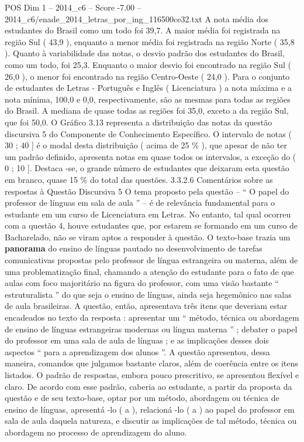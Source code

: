 \begin{textsample}{POS Dim 1 – 2014\_c6 – Score -7.00 – 2014\_c6/enade\_2014\_letras\_por\_ing\_116500ce32.txt}
A nota média dos estudantes do Brasil como um todo foi 39,7.
A maior média foi registrada na região Sul ( 43,9 ), enquanto a menor média foi registrada na região Norte ( 35,8 ).
Quanto à variabilidade das notas, o desvio padrão dos estudantes do Brasil, como um todo, foi 25,3.
Enquanto o maior desvio foi encontrado na região Sul ( 26,0 ), o menor foi encontrado na região Centro-Oeste ( 24,0 ).
Para o conjunto de estudantes de Letras - Português e Inglês ( Licenciatura ) a nota máxima e a nota mínima, 100,0 e 0,0, respectivamente, são as mesmas para todas as regiões do Brasil.
A mediana de quase todas as regiões foi 35,0, exceto a da região Sul, que foi 50,0.
O Gráfico 3.13 representa a distribuição das notas da questão discursiva 5 do Componente de Conhecimento Específico.
O intervalo de notas ( 30 ; 40 ] é o modal desta distribuição ( acima de 25 \% ), que apesar de não ter um padrão definido, apresenta notas em quase todos os intervalos, a exceção do ( 0 ; 10 ].
Destaca -se, o grande número de estudantes que deixaram esta questão em branco, quase 15 \% do total das questões. 3.3.2.6 Comentários sobre as respostas à Questão Discursiva 5 O tema proposto pela questão – “ O papel do professor de línguas em sala de aula ” – é de relevância fundamental para o estudante em um curso de Licenciatura em Letras.
No entanto, tal qual ocorreu com a questão 4, houve estudantes que, por estarem se formando em um curso de Bacharelado, não se viram aptos a responder à questão.
O texto-base trazia um \textbf{panorama} do ensino de línguas pautado no desenvolvimento de tarefas comunicativas propostas pelo professor de língua estrangeira ou materna, além de uma problematização final, chamando a atenção do estudante para o fato de que aulas com foco majoritário na figura do professor, com uma visão bastante “ estruturalista ” do que seja o ensino de línguas, ainda seja hegemônico nas salas de aula brasileiras.
A questão, então, apresentava três itens que deveriam estar encadeados no texto da resposta : apresentar um “ método, técnica ou abordagem de ensino de línguas estrangeiras modernas ou língua materna ” ; debater o papel do professor em uma sala de aula de línguas ; e as implicações desses dois aspectos “ para a aprendizagem dos alunos ”.
A questão apresentou, dessa maneira, comandos que julgamos bastante claros, além de coerência entre os itens listados.
O padrão de respostas, embora pouco prescritivo, se apresentou flexível e claro.
De acordo com esse padrão, caberia ao estudante, a partir da proposta da questão e de seu texto-base, optar por um método, abordagem ou técnica de ensino de línguas, apresentá -lo ( a ), relacioná -lo ( a ) ao papel do professor em sala de aula daquela natureza, e discutir as implicações de tal método, técnica ou abordagem no processo de aprendizagem do aluno.

\end{textsample}

